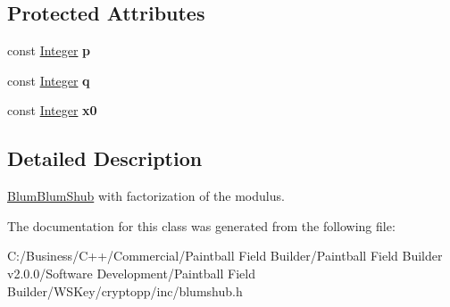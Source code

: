 \subsection*{Protected Attributes}
\begin{DoxyCompactItemize}
\item 
\hypertarget{class_blum_blum_shub_aea41f47a0b2fc6c05a80b3a59857e70b}{
const \hyperlink{class_integer}{Integer} {\bfseries p}}
\label{class_blum_blum_shub_aea41f47a0b2fc6c05a80b3a59857e70b}

\item 
\hypertarget{class_blum_blum_shub_aec0407cb51a5edac638ad7acc8380577}{
const \hyperlink{class_integer}{Integer} {\bfseries q}}
\label{class_blum_blum_shub_aec0407cb51a5edac638ad7acc8380577}

\item 
\hypertarget{class_blum_blum_shub_a3a402876633f8a93a59eb862a6e1f6ee}{
const \hyperlink{class_integer}{Integer} {\bfseries x0}}
\label{class_blum_blum_shub_a3a402876633f8a93a59eb862a6e1f6ee}

\end{DoxyCompactItemize}


\subsection{Detailed Description}
\hyperlink{class_blum_blum_shub}{BlumBlumShub} with factorization of the modulus. 

The documentation for this class was generated from the following file:\begin{DoxyCompactItemize}
\item 
C:/Business/C++/Commercial/Paintball Field Builder/Paintball Field Builder v2.0.0/Software Development/Paintball Field Builder/WSKey/cryptopp/inc/blumshub.h\end{DoxyCompactItemize}
